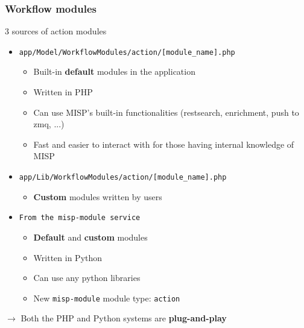 \begin{frame}
    \frametitle{Workflow modules}
    3 sources of action modules
    \begin{itemize}
        \item \texttt{\scriptsize app/Model/WorkflowModules/action/[module\_name].php}
        \begin{itemize}
            \item Built-in \textbf{default} modules in the application
            \item Written in PHP
            \item Can use MISP's built-in functionalities (restsearch, enrichment, push to zmq, ...)
            \item Fast and easier to interact with for those having internal knowledge of MISP
        \end{itemize}
        \item \texttt{\scriptsize app/Lib/WorkflowModules/action/[module\_name].php}
        \begin{itemize}
            \item \textbf{Custom} modules written by users
        \end{itemize}
        \item \texttt{From the misp-module service} 
        \begin{itemize}
            \item \textbf{Default} and \textbf{custom} modules
            \item Written in Python
            \item Can use any python libraries
            \item New \texttt{misp-module} module type: \texttt{action}
        \end{itemize}
    \end{itemize}
    \begin{center}
        $\rightarrow$ Both the PHP and Python systems are \textbf{plug-and-play}
    \end{center}
\end{frame}

